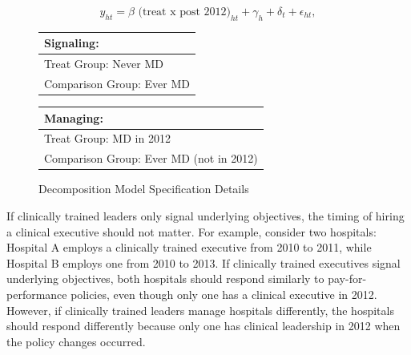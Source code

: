 \documentclass[12pt]{article}
\begin{document}
    \begin{equation}
    \label{eq:decomp}
    y_{ht} = \beta \text{ (treat x post 2012)}_{ht} + \gamma_{h} + \delta_t + \epsilon_{ht},
    \end{equation}
    

    \begin{figure}[ht!]
    \begin{center}
    \caption{\label{fig:decomp_spec}Decomposition Model Specification Details}
    \begin{tabular}{| m{18em} |}
     \hline
    Signaling:\\ [0.5ex]
    \hline\hline 
    \vspace{2mm}
    Treat Group:  \hspace{15mm} Never MD \\
    \vspace{2mm}
    Comparison Group: \hspace{3mm} Ever MD  \\
    [1ex]
    \hline
    \end{tabular}
    \hfil   %
     \begin{tabular}{|m{18em}|}
     \hline
     Managing:\\ [0.5ex]
     \hline\hline
     \vspace{2mm}
     Treat Group: \hspace{11mm} MD in 2012 \\
     \vspace{2mm}
     Comparison Group:  Ever MD (not in 2012)  \\
     [1ex]
     \hline
     \end{tabular}
    \end{center}
     \end{figure}

      If clinically trained leaders only signal underlying objectives, the timing of hiring a clinical executive should not matter. For example, consider two hospitals: Hospital A employs a clinically trained executive from 2010 to 2011, while Hospital B employs one from 2010 to 2013. If clinically trained executives signal underlying objectives, both hospitals should respond similarly to pay-for-performance policies, even though only one has a clinical executive in 2012. However, if clinically trained leaders manage hospitals differently, the hospitals should respond differently because only one has clinical leadership in 2012 when the policy changes occurred.
\end{document}

